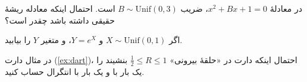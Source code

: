 \begin{exercise}
در معادلهٔ $x^2+Bx+1=0$، ضریب $B\sim\mathrm{Unif}(0,3)$ است. احتمال اینکه معادله ریشهٔ حقیقی داشته باشد چقدر است؟
\end{exercise}

\begin{exercise}
اگر $X\sim\mathrm{Unif}(0,1)$ و $Y=e^X$،  و  متغیر $Y$ را بیابید.
\end{exercise}

\begin{exercise}
در مثال دارت (\ref{ex:dart})، احتمال اینکه دارت در «حلقهٔ بیرونی» $\tfrac12\le R\le1$ بنشیند را یک بار با  و یک بار با انتگرال  حساب کنید.
\end{exercise}
